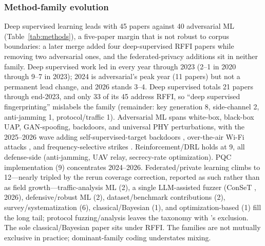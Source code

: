 \subsubsection{Method-family evolution}
Deep supervised learning leads with 45 papers against 40 adversarial ML (Table~\ref{tab:methods}), a five-paper margin that is not robust to corpus boundaries: a later merge added four deep-supervised RFFI papers while removing two adversarial ones, and the federated-privacy additions sit in neither family. Deep supervised work led in every year through 2023 (2--1 in 2020 through 9--7 in 2023); 2024 is adversarial's peak year (11 papers) but not a permanent lead change, and 2026 stands 3--4. Deep supervised totals 21 papers through end-2023, and only 33 of its 45 address RFFI, so ``deep supervised fingerprinting'' mislabels the family (remainder: key generation 8, side-channel 2, anti-jamming 1, protocol/traffic 1). Adversarial ML spans white-box, black-box UAP, GAN-spoofing, backdoors, and universal PHY perturbations, with the 2025--2026 wave adding self-supervised-target backdoors , over-the-air Wi-Fi attacks , and frequency-selective strikes . Reinforcement/DRL holds at 9, all defense-side (anti-jamming, UAV relay, secrecy-rate optimization). PQC implementation (9) concentrates 2024--2026. Federated/private learning climbs to 12---nearly tripled by the rerun coverage correction, reported as such rather than as field growth---traffic-analysis ML (2), a single LLM-assisted fuzzer (ConSeT , 2026), defensive/robust ML (2), dataset/benchmark contributions (2), survey/systematization (6), classical/Bayesian (1), and optimization-based (1) fill the long tail; protocol fuzzing/analysis leaves the taxonomy with 's exclusion. The sole classical/Bayesian paper sits under RFFI. The families are not mutually exclusive in practice; dominant-family coding understates mixing.

